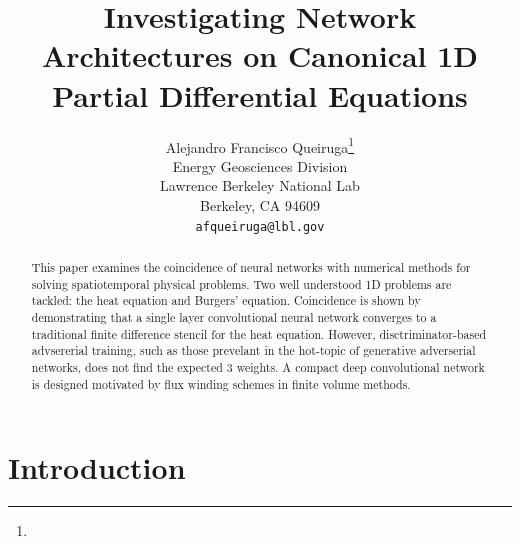 \documentclass{article}
\title{Investigating Network Architectures on Canonical 1D Partial Differential Equations}
\author{%
  Alejandro Francisco Queiruga\thanks{} \\
  Energy Geosciences Division\\
  Lawrence Berkeley National Lab\\
  Berkeley, CA 94609\\
  \texttt{afqueiruga@lbl.gov} \\
}
\begin{document}
\maketitle

\begin{abstract}
  This paper examines the coincidence of neural networks with
  numerical methods for solving spatiotemporal physical problems.
  Two well understood 1D problems are tackled: the heat equation and
  Burgers' equation. Coincidence is shown by demonstrating that a single layer convolutional neural network converges to a traditional finite difference stencil for the
  heat equation. However, disctriminator-based advsererial training, such as those prevelant in
  the hot-topic of generative adverserial networks, does not find the
  expected 3 weights. A compact deep convolutional network is designed
  motivated by flux winding schemes in finite volume methods. 
\end{abstract}

\section{Introduction}
\end{document}
